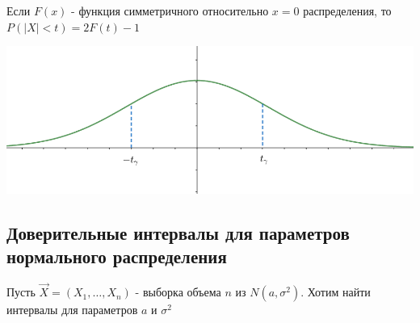 \documentclass[12pt]{article}
\begin{document}
\Nota Если $F(x)$ - функция симметричного относительно $x = 0$ распределения, то $P(|X| < t) = 2F(t) - 1$


\begin{center}
    \includegraphics[width=15cm]{mathstat/images/mathstat_2025_03_11_2}
\end{center}

\subsection{Доверительные интервалы для параметров нормального распределения}

Пусть $\vec X = (X_1, \dots, X_n)$ - выборка объема $n$ из $N(a, \sigma^2)$. 
Хотим найти интервалы для параметров $a$ и $\sigma^2$
\end{document}
